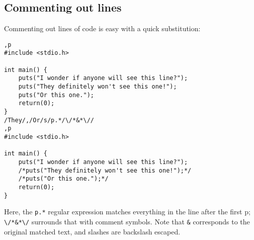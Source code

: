 \documentclass[12pt]{article}
\begin{document}
\subsection{Commenting out lines}

Commenting out lines of code is easy with a quick substitution:

\begin{lstlisting}
,p
#include <stdio.h>

int main() {
    puts("I wonder if anyone will see this line?");
    puts("They definitely won't see this one!");
    puts("Or this one.");
    return(0);
}
/They/,/Or/s/p.*/\/*&*\//
,p
#include <stdio.h>

int main() {
    puts("I wonder if anyone will see this line?");
    /*puts("They definitely won't see this one!");*/
    /*puts("Or this one.");*/
    return(0);
}
\end{lstlisting}

Here, the \lstinline{p.*} regular expression matches everything in the line after the first p; \lstinline{\/*&*\/}
surrounds that with comment symbols. Note that \lstinline{&} corresponds to the original matched text, and
slashes are backslash escaped.





\end{document}

